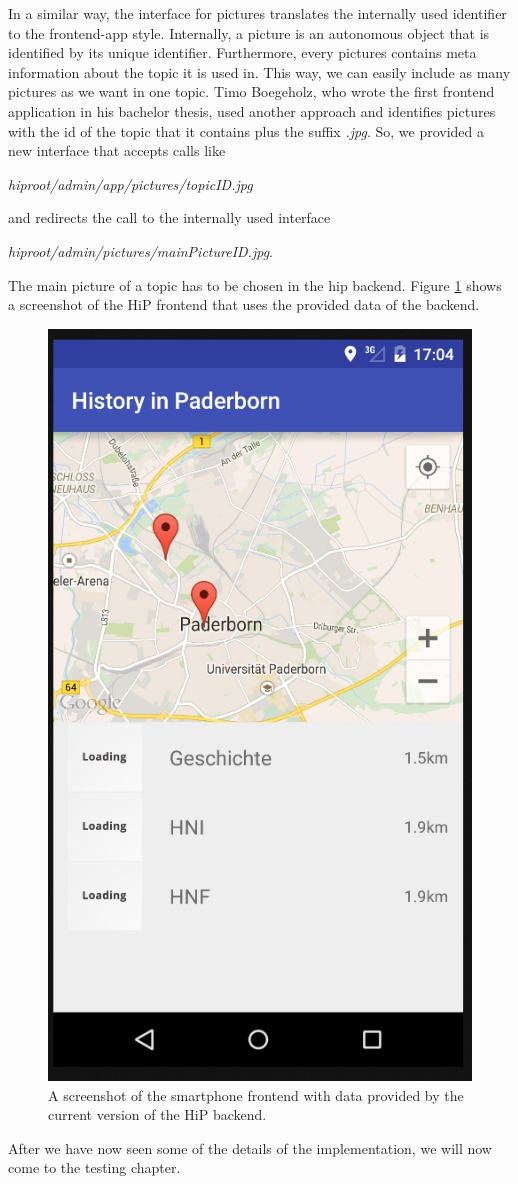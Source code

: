 In a similar way, the interface for pictures translates the internally used identifier to the frontend-app style. Internally, a picture is an autonomous object that is identified by its unique identifier. Furthermore, every pictures contains meta information about the topic it is used in. This way, we can easily include as many pictures as we want in one topic. Timo Boegeholz, who wrote the first frontend application in his bachelor thesis, used another approach and identifies pictures with the id of the topic that it contains plus the suffix \emph{.jpg}. So, we provided a new interface that accepts calls like 

\emph{hiproot/admin/app/pictures/topicID.jpg} 

and redirects the call to the internally used interface

\emph{hiproot/admin/pictures/mainPictureID.jpg}. 

The main picture of a topic has to be chosen in the hip backend. Figure \ref{frontendScreenshot} shows a screenshot of the \ac{HiP} frontend that uses the provided data of the backend.

\begin{figure}[th]
\centerline{\includegraphics[width=.5\textwidth]{gfx/frontend.jpg}}
\caption{A screenshot of the smartphone frontend with data provided by the current version of the \ac{HiP} backend.}
\label{frontendScreenshot}
\end{figure}     

After we have now seen some of the details of the implementation, we will now come to the testing chapter. 